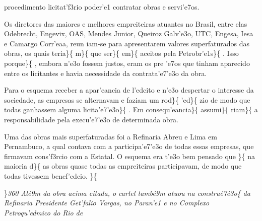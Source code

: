 procedimento licitat'f3rio poder'e1 contratar obras e servi'e7os.
\par \tab Os diretores das maiores e melhores empreiteiras atuantes no
Brasil, entre elas Odebrecht, Engevix, OAS, Mendes Junior, Queiroz
Galv'e3o, UTC, Engesa, Iesa e Camargo Corr'eaa, reun iam-se para
apresentarem valores superfaturados das obras, os quais
teria\}\{\rtlch{}  \ltrch{}  m\}\{\rtlch{}
 \ltrch{}  que ser\}\{\rtlch{}
 \ltrch{}  em\}\{ \rtlch{}  \ltrch{}
 aceitos pela Petrobr'e1s\}\{\rtlch{}
 \ltrch{}  . Isso porque\}\{\rtlch{} 
\ltrch{}  , embora n'e3o fossem
justos, eram os pre 'e7os que tinham aparecido entre os licitantes e
havia necessidade da contrata'e7'e3o da obra. \par \tab Para o esquema
receber a apar'eancia de l'edcito e n'e3o despertar o interesse da
sociedade, as empresas se alternavam e faziam um rod\}\{\rtlch{} 
\ltrch{}  'ed\}\{\rtlch{}  \ltrch{}
 zio de modo que todas ganhassem alguma
licita'e7'e3o\}\{\rtlch{}  \ltrch{}  . Em
consequ'eancia\}\{\rtlch{}  \ltrch{}
 assumi\}\{\rtlch{}  \ltrch{}
 riam\}\{\rtlch{}  \ltrch{}
 a responsabilidade pela execu'e7'e3o de
determinada obra. \par \tab Uma das obras mais superfaturadas foi a
Refinaria Abreu e Lima em Pernambuco, a qual contava com a
participa'e7'e3o de todas essas empresas, que firmavam cons'f3rcio com a
Estatal. O esquema era t'e3o bem pensado que \}\{\rtlch{} 
\ltrch{}  na maioria d\}\{\rtlch{} 
\ltrch{}  as obras quase todas as
empreiteiras participavam, de modo que todas tivessem benef'edcio.
\}\{\rtlch{}  \ltrch{} 
\par \}\pard \ltrpar\qj {}\sl360\widctlpar\wrapdefault\faauto{} {\rtlch{}  \ltrch{}  Al\'e9m da obra acima citada, o cartel tamb\'e9m atuou na }{\rtlch{}  
\ltrch{}  constru\'e7\'e3o}\{\rtlch{} 
\ltrch{}  da Refinaria Presidente
Get'falio Vargas, no Paran'e1 e no Complexo Petroqu'edmico do Rio de
